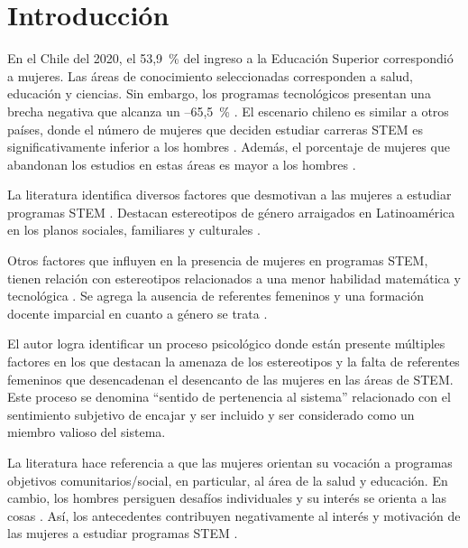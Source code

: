 \documentclass[spanish]{textolivre}
\begin{document}
\begin{polyabstract}
\begin{english}
\begin{abstract}

\end{abstract}
\end{english}
\end{polyabstract}

\section{Introducción}\label{sec-intro}


En el Chile del 2020, el 53,9~\% del ingreso a la Educación Superior correspondió a mujeres. Las áreas de conocimiento seleccionadas corresponden a salud, educación y ciencias. Sin embargo, los programas tecnológicos presentan una brecha negativa que alcanza un –65,5~\% \cite{Futuro2020}. El escenario chileno es similar a otros países, donde el número de mujeres que deciden estudiar carreras STEM es significativamente inferior a los hombres \cite{Guzman2021}. Además, el porcentaje de mujeres que abandonan los estudios en estas áreas es mayor a los hombres   \cite{Botella2019,Garcia-Holgado2020,Costa2021,Bastarrica2019}.

La literatura identifica diversos factores que desmotivan a las mujeres a estudiar programas STEM \cite{Botella2019}. Destacan estereotipos de género arraigados en Latinoamérica en los planos sociales, familiares y culturales \cite{McGuire2020,Villasenor2020,Bastarrica2018}.

Otros factores que influyen en la presencia de mujeres en programas STEM, tienen relación con estereotipos relacionados a una menor habilidad matemática \cite{McGuire2020,Garcia-Holgado2020} y tecnológica \cite{Prendes-Espinosa2020}. Se agrega la ausencia de referentes femeninos \cite{Futuro2020}  y una formación docente imparcial en cuanto a género se trata \cite{Prendes-Espinosa2020}. 

El autor \cite{Lewis2017} logra identificar un proceso psicológico donde están presente múltiples factores en los que destacan la amenaza de los estereotipos  y la falta de referentes femeninos que desencadenan el desencanto de las mujeres en las áreas de STEM. Este proceso se denomina “sentido de pertenencia al sistema” relacionado con el sentimiento subjetivo de encajar y ser incluido y ser considerado como un miembro valioso del sistema.

La literatura hace referencia a que las mujeres orientan su vocación a programas objetivos comunitarios/social, en particular, al área de la salud y educación. En cambio, los hombres persiguen desafíos individuales y su interés se orienta a las cosas \cite{Costa2021}. Así, los antecedentes contribuyen negativamente al interés y motivación de las mujeres a estudiar programas STEM \cite{Sinclair2019}.
\end{document}
